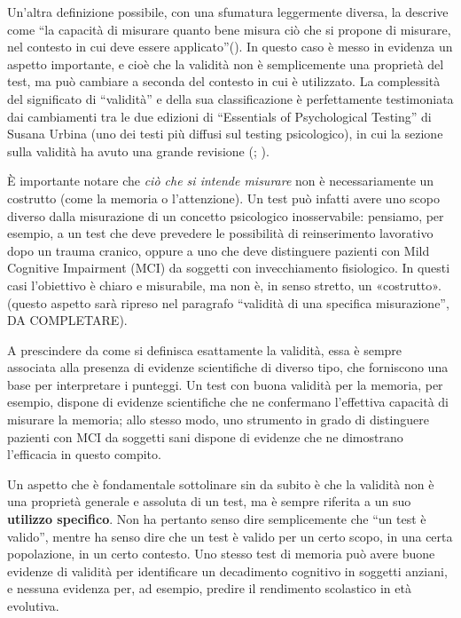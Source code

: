 \documentclass[
  italian,
  letterpaper,
  paper=6in:9in,
  pagesize=pdftex,
  headinclude=on,
  footinclude=on,
  11pt]{scrbook}
\begin{document}
Un'altra definizione possibile, con una sfumatura leggermente diversa,
la descrive come ``la capacità di misurare quanto bene misura ciò che si
propone di misurare, nel contesto in cui deve essere
applicato''(\cite{nunnally1994psychometric}). In questo caso è messo in
evidenza un aspetto importante, e cioè che la validità non è
semplicemente una proprietà del test, ma può cambiare a seconda del
contesto in cui è utilizzato. La complessità del significato di
``validità'' e della sua classificazione è perfettamente testimoniata
dai cambiamenti tra le due edizioni di ``Essentials of Psychological
Testing'' di Susana Urbina (uno dei testi più diffusi sul testing
psicologico), in cui la sezione sulla validità ha avuto una grande
revisione (\cite{urbina2004essentials}; \cite{urbina2014essentials}).

È importante notare che \emph{ciò che si intende misurare} non è
necessariamente un costrutto (come la memoria o l'attenzione). Un test
può infatti avere uno scopo diverso dalla misurazione di un concetto
psicologico inosservabile: pensiamo, per esempio, a un test che deve
prevedere le possibilità di reinserimento lavorativo dopo un trauma
cranico, oppure a uno che deve distinguere pazienti con Mild Cognitive
Impairment (MCI) da soggetti con invecchiamento fisiologico. In questi
casi l'obiettivo è chiaro e misurabile, ma non è, in senso stretto, un
«costrutto». (questo aspetto sarà ripreso nel paragrafo ``validità di
una specifica misurazione'', DA COMPLETARE).

A prescindere da come si definisca esattamente la validità, essa è
sempre associata alla presenza di evidenze scientifiche di diverso tipo,
che forniscono una base per interpretare i punteggi. Un test con buona
validità per la memoria, per esempio, dispone di evidenze scientifiche
che ne confermano l'effettiva capacità di misurare la memoria; allo
stesso modo, uno strumento in grado di distinguere pazienti con MCI da
soggetti sani dispone di evidenze che ne dimostrano l'efficacia in
questo compito.

Un aspetto che è fondamentale sottolinare sin da subito è che la
validità non è una proprietà generale e assoluta di un test, ma è sempre
riferita a un suo \textbf{utilizzo specifico}. Non ha pertanto senso
dire semplicemente che ``un test è valido'', mentre ha senso dire che un
test è valido per un certo scopo, in una certa popolazione, in un certo
contesto. Uno stesso test di memoria può avere buone evidenze di
validità per identificare un decadimento cognitivo in soggetti anziani,
e nessuna evidenza per, ad esempio, predire il rendimento scolastico in
età evolutiva.
\end{document}
